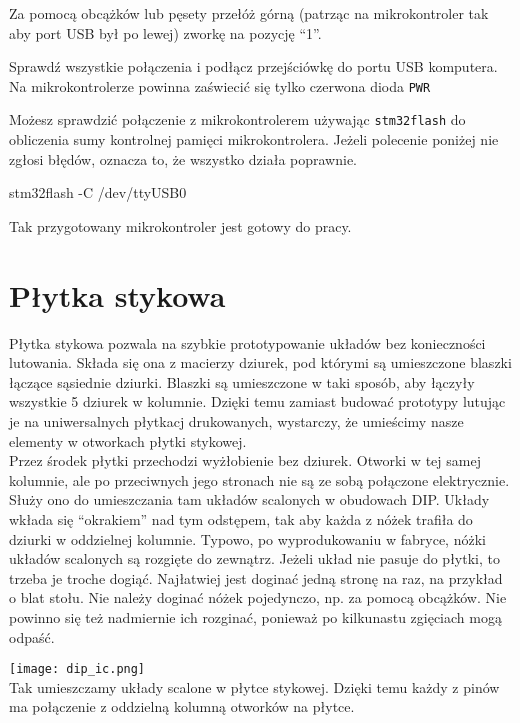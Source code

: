 \documentclass{pdfBooklets}
\begin{document}
Za pomocą obcążków lub pęsety przełóż górną (patrząc na mikrokontroler tak aby port USB był po lewej) zworkę na
pozycję ``1''.

Sprawdź wszystkie połączenia i podłącz przejściówkę do portu USB komputera. Na mikrokontrolerze powinna zaświecić się tylko czerwona dioda
\texttt{PWR}

Możesz sprawdzić połączenie z mikrokontrolerem używając \Verb$stm32flash$ do obliczenia sumy kontrolnej pamięci mikrokontrolera.
Jeżeli polecenie poniżej nie zgłosi błędów, oznacza to, że wszystko działa poprawnie.

\begin{CodeFrame*}[bash]{}
stm32flash -C /dev/ttyUSB0
\end{CodeFrame*}

Tak przygotowany mikrokontroler jest gotowy do pracy.


\section{Płytka stykowa}
Płytka stykowa pozwala na szybkie prototypowanie układów bez konieczności lutowania. Składa się ona z macierzy dziurek,
pod którymi są umieszczone blaszki łączące sąsiednie dziurki. Blaszki są umieszczone w taki sposób, aby łączyły wszystkie
5 dziurek w kolumnie. Dzięki temu zamiast budować prototypy lutując je na uniwersalnych płytkacj drukowanych, wystarczy, że
umieścimy nasze elementy w otworkach płytki stykowej. 
\\

Przez środek płytki przechodzi wyżłobienie bez dziurek. Otworki w tej samej kolumnie, ale po przeciwnych jego
stronach nie są ze sobą połączone elektrycznie. Służy ono do umieszczania tam układów scalonych w obudowach DIP.
Układy wkłada się ``okrakiem'' nad tym odstępem, tak aby każda z nóżek trafiła do dziurki w oddzielnej kolumnie.
Typowo, po wyprodukowaniu w fabryce, nóżki układów scalonych są rozgięte do zewnątrz. Jeżeli układ nie pasuje do płytki,
to trzeba je troche dogiąć.
Najłatwiej jest doginać jedną stronę na raz, na przykład o blat stołu. Nie należy doginać nóżek pojedynczo, np. za pomocą obcążków.
Nie powinno się też nadmiernie ich rozginać, ponieważ po kilkunastu zgięciach mogą odpaść.
\\

\begin{Ramka}{}\begin{center}
  \noindent\texttt{[image: dip\_ic.png]}\\
  Tak umieszczamy układy scalone w płytce stykowej. Dzięki temu każdy z pinów ma połączenie z oddzielną kolumną otworków na płytce.
\end{center}\end{Ramka}
\end{document}
